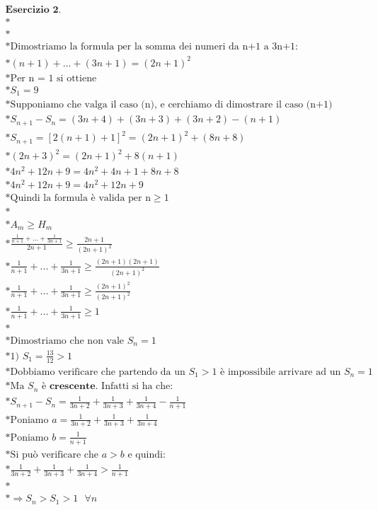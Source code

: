 \documentclass{article}
\begin{document}
\pagebreak

\begin{gather*}
\textbf{Esercizio 2.}\\*\\*\\*
\text{Dimostriamo la formula per la somma dei numeri da n+1 a 3n+1:}\\*
(n+1) + ... + (3n+1) = (2n+1)^2\\*
\text{Per n = 1 si ottiene}\\*
S_1 = 9\\*
\text{Supponiamo che valga il caso (n), e cerchiamo di dimostrare il caso (n+1)}\\*
S_{n+1} - S_n = (3n+4) + (3n+3) + (3n+2) - (n+1)\\*
S_{n+1} = [2(n+1) + 1]^2 = (2n+1)^2 + (8n+8)\\*
(2n+3)^2 = (2n+1)^2 + 8(n+1)\\*
4n^2 + 12n + 9 = 4n^2 + 4n +1 + 8n + 8\\*
4n^2 + 12n + 9 = 4n^2 + 12n + 9\\*
\text{Quindi la formula è valida per n} \geq 1\\*\\*
A_m \geq H_m\\*
\frac{\frac{1}{n+1} + ... + \frac{1}{3n+1}}{2n+1} \geq \frac{2n+1}{(2n+1)^2}\\*
\frac{1}{n+1} + ... + \frac{1}{3n+1} \geq \frac{(2n+1)(2n+1)}{(2n+1)^2}\\*
\frac{1}{n+1} + ... + \frac{1}{3n+1} \geq \frac{(2n+1)^2}{(2n+1)^2}\\*
\frac{1}{n+1} + ... + \frac{1}{3n+1} \geq 1\\*\\*
\text{Dimostriamo che non vale } S_n = 1\\*
\text{1) } S_1 = \frac{13}{12} > 1\\*
\text{Dobbiamo verificare che partendo da un } S_1 > 1 \text{ è impossibile arrivare ad un } S_n = 1\\*
\text{Ma } S_n \text{ è} \textbf{ crescente} \text{. Infatti si ha che:}\\*
 S_{n+1} - S_n = \frac{1}{3n+2} + \frac{1}{3n+3} + \frac{1}{3n+4} - \frac{1}{n+1}\\*
\text{Poniamo } a = \frac{1}{3n+2} + \frac{1}{3n+3} + \frac{1}{3n+4}\\*
\text{Poniamo } b = \frac{1}{n+1}\\*
\text{Si può verificare che } a > b \text{ e quindi:}\\*
\frac{1}{3n+2} + \frac{1}{3n+3} + \frac{1}{3n+4} > \frac{1}{n+1}\\*\\*
\Rightarrow S_n > S_1 > 1 \text{ } \forall n
\end{gather*}
\end{document}
